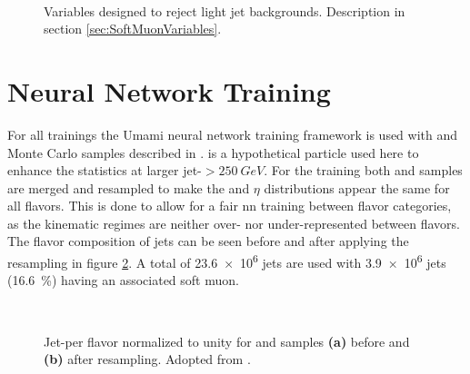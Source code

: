 \begin{figure}[]
  \centering
  \\
  \caption{Variables designed to reject light jet backgrounds. Description in section \ref{sec:SoftMuonVariables}.}
  \label{fig:softMuonVariables2}
\end{figure}


\section{Neural Network Training}
For all trainings the Umami neural network training framework \citep{Froch:2857164} is used with \ttbar and \Zprime Monte Carlo samples described in \citep{ATL-PHYS-PUB-2017-013}. \Zprime is a hypothetical particle used here to enhance the statistics at larger jet-\pt$>\SI{250}{GeV}$. For the training both \ttbar and \Zprime samples are merged and resampled to make the \pt and $\eta$ distributions appear the same for all flavors. This is done to allow for a fair \ac{nn} training between flavor categories, as the kinematic regimes are neither over- nor under-represented between flavors. The flavor composition of jets can be seen before and after applying the resampling in figure \ref{fig:resampling}. A total of \qty{23.6e6}{} jets are used with \qty{3.9e6}{} jets (\qty{16.6}{\percent}) having an associated soft muon.
\begin{figure}
  \centering
  \\
  \caption[]{Jet-\pt per flavor normalized to unity for \ttbar and \Zprime samples \textbf{(a)} before and \textbf{(b)} after resampling. Adopted from \citep{umamiDocs}.}
  \label{fig:resampling}
\end{figure}


